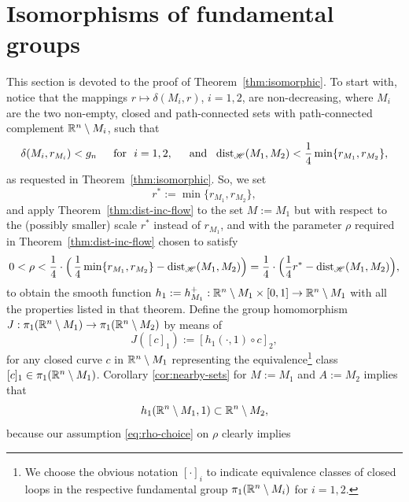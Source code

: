 \section{Isomorphisms of fundamental groups}\label{sec:iso}
This section is devoted to the proof of Theorem~\ref{thm:isomorphic}. 
To start with, notice that  the mappings $r\mapsto\delta(M_i,r)$,
$i=1,2$, are non-decreasing, where $M_i$ are
the two non-empty,
closed and path-connected sets with path-connected complement 
$\mathbb{R}^n\setminus M_i$,
such that
\begin{equation}\label{eq:distortion-assumptions}
\delta(M_i,r_{M_i})< g_n\quad\,\,\,\text{for }\,\, i=1,2, \quad\,\,\,\text{and }\,\, 
\operatorname{dist}_{\mathscr{H}}(M_1,M_2)<\frac14
\min\{r_{M_1},r_{M_2}\},
\end{equation}
as requested in Theorem~\ref{thm:isomorphic}. 
So, we set
\begin{equation}\label{eq:r*}
r^*:=\min\{r_{M_1},r_{M_2}\},
\end{equation}
and apply Theorem~\ref{thm:dist-inc-flow} to the set $M:=M_1$
but with respect to the (possibly smaller) scale $r^*$ instead
of $r_{M_1}$, and with 
the parameter $\rho$ required in Theorem~\ref{thm:dist-inc-flow} 
chosen to satisfy
\begin{equation}\label{eq:rho-choice}
0<\rho<\frac14\cdot\Big(\,\frac14\min\{r_{M_1},r_{M_2}\}-\operatorname{dist}_{\mathscr{H}}(M_1,M_2)\Big)=\frac14\cdot\Big(\frac14 r^*-\operatorname{dist}_{\mathscr{H}}(M_1,M_2)\Big),
\end{equation}
to obtain the smooth function $h_1:=h_{M_1}^+:\mathbb{R}^n\setminus M_1\times [0,1]\to\mathbb{R}^n
\setminus  M_1$ with all the properties listed in that theorem.
Define the 
group homomorphism
$J:\pi_1(\mathbb{R}^n\setminus M_1)\to 
\pi_1(\mathbb{R}^n\setminus M_2) $ by means of
\begin{equation}\label{eq:def-J}
J([c]_1):=[h_1(\cdot,1)\circ c]_2,
\end{equation}
for any closed curve $c$ in $\mathbb{R}^n\setminus M_1$ representing the equivalence\footnote{We
choose the obvious notation $[\cdot]_i$ 
to indicate equivalence classes of closed loops 
in
the respective fundamental  group $\pi_1(\mathbb{R}^n\setminus M_i)$ for $i=1,2$.}
class $[c]_1\in\pi_1(\mathbb{R}^n\setminus M_1)$. Corollary \ref{cor:nearby-sets}
for $M:=M_1$ and $A:=M_2$ implies that
\begin{equation}\label{eq:respect-complements}
h_1(\mathbb{R}^n\setminus M_1,1)\subset \mathbb{R}^n\setminus M_2,
\end{equation}
because our assumption \eqref{eq:rho-choice} on $\rho$ clearly implies
